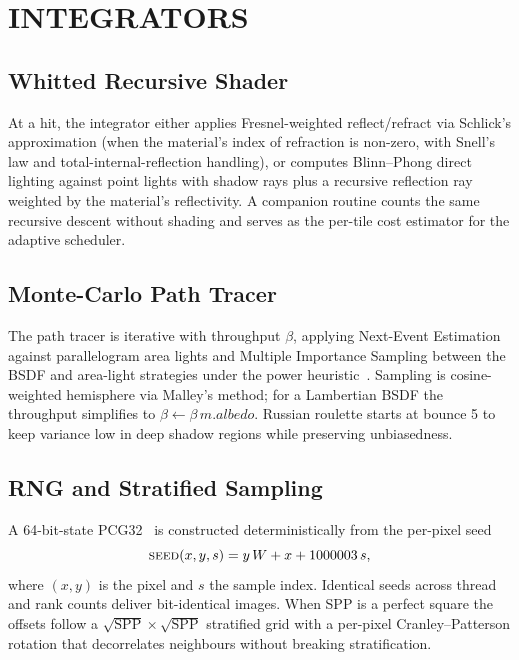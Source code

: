 \documentclass[twocolumn,10pt,cleanhead,cleanfoot]{asme2e}
\begin{document}
\section*{INTEGRATORS}

\subsection*{Whitted Recursive Shader}
At a hit, the integrator either applies Fresnel-weighted reflect/refract via Schlick's approximation (when the material's index of refraction is non-zero, with Snell's law and total-internal-reflection handling), or computes Blinn--Phong direct lighting against point lights with shadow rays plus a recursive reflection ray weighted by the material's reflectivity. A companion routine counts the same recursive descent without shading and serves as the per-tile cost estimator for the adaptive scheduler.

\subsection*{Monte-Carlo Path Tracer}
The path tracer is iterative with throughput $\beta$, applying Next-Event Estimation against parallelogram area lights and Multiple Importance Sampling between the BSDF and area-light strategies under the power heuristic~\cite{veach1995mis}. Sampling is cosine-weighted hemisphere via Malley's method; for a Lambertian BSDF the throughput simplifies to $\beta\!\leftarrow\!\beta\,m.\mathit{albedo}$. Russian roulette starts at bounce 5 to keep variance low in deep shadow regions while preserving unbiasedness.

\subsection*{RNG and Stratified Sampling}
A 64-bit-state PCG32~\cite{oneill2014pcg} is constructed deterministically from the per-pixel seed
\begin{equation}
\textsc{seed}(x,y,s) = y\,W + x + 1000003\,s,
\label{eq:seed}
\end{equation}
where $(x,y)$ is the pixel and $s$ the sample index. Identical seeds across thread and rank counts deliver bit-identical images. When SPP is a perfect square the offsets follow a $\sqrt{\mathrm{SPP}}\!\times\!\sqrt{\mathrm{SPP}}$ stratified grid with a per-pixel Cranley--Patterson rotation that decorrelates neighbours without breaking stratification.

\end{document}
